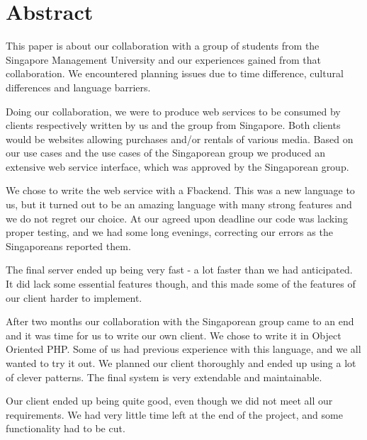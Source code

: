 \section*{Abstract}
This paper is about our collaboration with a group of students from the Singapore Management University and our experiences gained from that collaboration. We encountered planning issues due to time difference, cultural differences and language barriers.

Doing our collaboration, we were to produce web services to be consumed by clients respectively written by us and the group from Singapore. Both clients would be websites allowing purchases and/or rentals of various media.
Based on our use cases and the use cases of the Singaporean group we produced an extensive web service interface, which was approved by the Singaporean group. 

We chose to write the web service with a F\Sh backend. This was a new language to us, but it turned out to be an amazing language with many strong features and we do not regret our choice.
At our agreed upon deadline our code was lacking proper testing, and we had some long evenings, correcting our errors as the Singaporeans reported them.

The final server ended up being very fast - a lot faster than we had anticipated. It did lack some essential features though, and this made some of the features of our client harder to implement.

After two months our collaboration with the Singaporean group came to an end and it was time for us to write our own client. We chose to write it in Object Oriented PHP. Some of us had previous experience with this language, and we all wanted to try it out. We planned our client thoroughly and ended up using a lot of clever patterns. The final system is very extendable and maintainable.

Our client ended up being quite good, even though we did not meet all our requirements. We had very little time left at the end of the project, and some functionality had to be cut.
\newpage